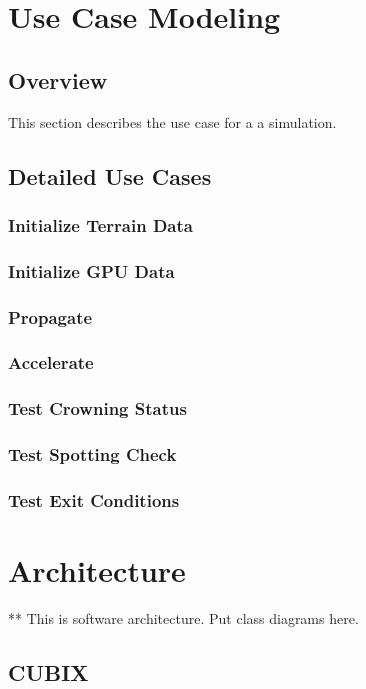 \section{Use Case Modeling}
\subsection{Overview}
This section describes the use case for a a simulation.



\subsection{Detailed Use Cases}

\subsubsection{Initialize Terrain Data}
 

\subsubsection{Initialize GPU Data}


\subsubsection{Propagate}

\subsubsection{Accelerate}


\subsubsection{Test Crowning Status}


\subsubsection{Test Spotting Check}


\subsubsection{Test Exit Conditions}


\section{Architecture}
** This is software architecture. Put class diagrams here. 
\subsection{CUBIX}
